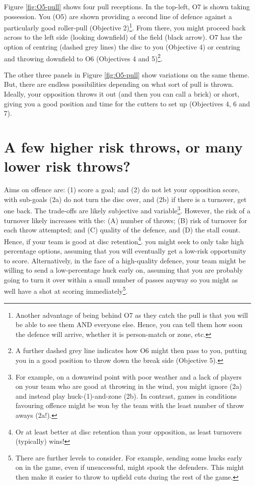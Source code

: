 \documentclass{tufte-handout}
\begin{document}
Figure \ref{fig:O5-pull}
shows four pull receptions. 
In the top-left, 
O7 is shown 
taking possession. 
You (O5) 
are shown 
providing a 
second line of defence 
against a particularly 
good roller-pull 
(Objective 2)\footnote{
Another advantage of 
being behind O7 
as they catch the pull 
is that you will be able to 
see them AND everyone else. 
Hence, you can tell them how soon 
the defence will arrive, 
whether it is person-match 
or zone, etc.}.  
From there, you might 
proceed back across to the 
left side (looking downfield) 
of the field 
(black arrow). 
O7 has the option of 
centring (dashed grey lines) 
the disc to you 
(Objective 4) 
or centring 
and throwing downfield 
to O6 
(Objectives 4 and 5)\footnote{
A further dashed grey line 
indicates how O6 
might then pass to you, 
putting you in a good position 
to throw down the break side 
(Objective 5).}. 

The other three panels 
in Figure \ref{fig:O5-pull} 
show variations 
on the same theme. 
But, there are endless 
possibilities depending 
on what sort of pull is thrown. 
Ideally, 
your opposition throws it out  
(and then you can call a brick) 
or short, giving you a good position 
and time for the cutters to set up  
(Objectives 4, 6 and 7). 

\section{A few higher risk throws, or many lower risk throws? }\label{sec:risk}
Aims 
on offence are: 
(1) score a goal; and
(2) do not let 
your opposition 
score, with 
sub-goals
(2a) do not turn the disc over, 
and 
(2b) if there is a turnover, 
get one back. 
The trade-offs 
are likely 
subjective 
and variable\footnote{
For example, on a 
downwind point 
with poor weather 
and a lack of players
on your team who are good 
at throwing in the wind, 
you might ignore (2a) 
and instead play huck-(1)-and-zone (2b). 
In contrast, 
games in conditions favouring 
offence might 
be won by the team 
with the least number of
throw aways (2a!).}.
However, 
the risk of a turnover 
likely increases with the: 
(A) number of throws; 
(B) risk of turnover for each throw attempted; and 
(C) quality of the defence, and 
(D) the stall count.  
Hence, 
if your team 
is good at disc retention\footnote{
Or at least 
better 
at disc retention 
than your opposition,  
as least turnovers 
(typically) wins!}.
you might seek to 
only take 
high percentage options, 
assuming that you 
will eventually 
get a low-risk opportunity 
to score.  
Alternatively, 
in the face 
of a high-quality 
defence, 
your team might be willing to 
send a low-percentage huck early on, 
assuming that you are 
probably going to turn it over 
within a small number of passes 
anyway so you might as well 
have a shot at scoring immediately\footnote{
There are further levels to consider. 
For example, sending some 
hucks early on in the game, 
even if unsuccessful, 
might spook the defenders. 
This might then make it 
easier to throw to upfield cuts 
during the rest of the game.}.  
\end{document}
